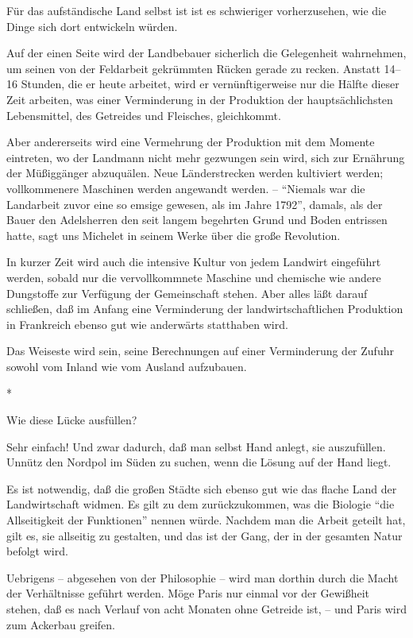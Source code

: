 \documentclass{scrbook}
\begin{document}
Für das aufständische Land selbst ist ist es schwieriger vorherzusehen, wie die Dinge sich dort entwickeln würden.

Auf der einen Seite wird der Landbebauer sicherlich die Gelegenheit wahrnehmen, um seinen von der Feldarbeit gekrümmten Rücken gerade zu recken. Anstatt 14–16 Stunden, die er heute arbeitet, wird er vernünftigerweise nur die Hälfte dieser Zeit arbeiten, was einer Verminderung in der Produktion der hauptsächlichsten Lebensmittel, des Getreides und Fleisches, gleichkommt.

Aber andererseits wird eine Vermehrung der Produktion mit dem Momente eintreten, wo der Landmann nicht mehr gezwungen sein wird, sich zur Ernährung der Müßiggänger abzuquälen. Neue Länderstrecken werden kultiviert werden; vollkommenere Maschinen werden angewandt werden. – ``Niemals war die Landarbeit zuvor eine so emsige gewesen, als im Jahre 1792'', damals, als der Bauer den Adelsherren den seit langem begehrten Grund und Boden entrissen hatte, sagt uns Michelet in seinem Werke über die große Revolution.

In kurzer Zeit wird auch die intensive Kultur von jedem Landwirt eingeführt werden, sobald nur die vervollkommnete Maschine und chemische wie andere Dungstoffe zur Verfügung der Gemeinschaft stehen. Aber alles läßt darauf schließen, daß im Anfang eine Verminderung der landwirtschaftlichen Produktion in Frankreich ebenso gut wie anderwärts statthaben wird.

Das Weiseste wird sein, seine Berechnungen auf einer Verminderung der Zufuhr sowohl vom Inland wie vom Ausland aufzubauen.

\begin{center}*\end{center}

Wie diese Lücke ausfüllen?

Sehr einfach! Und zwar dadurch, daß man selbst Hand anlegt, sie auszufüllen. Unnütz den Nordpol im Süden zu suchen, wenn die Lösung auf der Hand liegt.

Es ist notwendig, daß die großen Städte sich ebenso gut wie das flache Land der Landwirtschaft widmen. Es gilt zu dem zurückzukommen, was die Biologie ``die Allseitigkeit der Funktionen'' nennen würde. Nachdem man die Arbeit geteilt hat, gilt es, sie allseitig zu gestalten, und das ist der Gang, der in der gesamten Natur befolgt wird.

Uebrigens – abgesehen von der Philosophie – wird man dorthin durch die Macht der Verhältnisse geführt werden. Möge Paris nur einmal vor der Gewißheit stehen, daß es nach Verlauf von acht Monaten ohne Getreide ist, – und Paris wird zum Ackerbau greifen.
\end{document}
